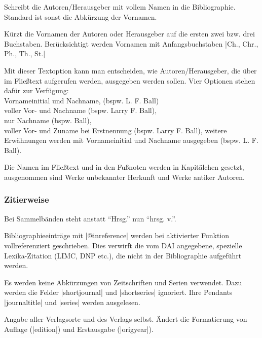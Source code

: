 \documentclass[a4paper,10pt,ngerman]{ltxdoc}
\begin{document}
  Schreibt die Autoren/Herausgeber mit vollem Namen in die Bibliographie. Standard ist sonst die Abkürzung der Vornamen. 

  Kürzt die Vornamen der Autoren oder Herausgeber auf die ersten zwei bzw. drei Buchstaben.
Berücksichtigt werden Vornamen mit Anfangsbuchstaben |Ch., Chr., Ph., Th., St.|

Mit dieser Textoption kann man entscheiden, 
wie Autoren/Herausgeber, die über \- im Fließtext aufgerufen werden,
ausgegeben werden sollen.
Vier Optionen stehen dafür zur Verfügung:\\
Vornameinitial und Nachname, (bspw. L. F. Ball)\\
voller Vor- und Nachname (bspw. Larry F. Ball),\\
nur Nachname (bspw. Ball), \\
voller Vor- und Zuname bei Erstnennung (bspw. Larry F. Ball), 
weitere Erwähnungen werden mit Vornameinitial und Nachname ausgegeben (bspw. L. F. Ball).

  Die Namen im Fließtext und in den Fußnoten werden in Kapitälchen gesetzt, ausgenommen sind Werke unbekannter Herkunft und Werke antiker Autoren.

\subsubsection{Zitierweise}

  Bei Sammelbänden steht anstatt \enquote{Hrsg.} nun \enquote{hrsg. v.}.

  Bibliographieeinträge mit |@inreference| werden bei aktivierter Funktion vollreferenziert geschrieben. 
Dies verwirft die vom DAI angegebene, spezielle Lexika-Zitation (LIMC, DNP etc.), die  nicht in der Bibliographie aufgeführt werden. 

  Es werden keine Abkürzungen von Zeitschriften und Serien verwendet. Dazu werden die Felder |shortjournal| und |shortseries| ignoriert. Ihre Pendants |journaltitle| und |series| werden ausgelesen.

  Angabe aller Verlagsorte und des Verlags selbst. Ändert die Formatierung von Auflage (|edition|) und Erstausgabe (|origyear|).
\end{document}
